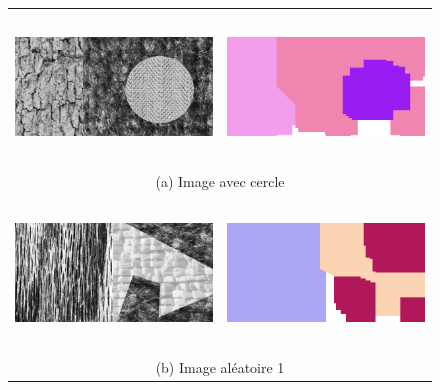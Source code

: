 \begin{figure}

\begin{tabular}{cccc}


\multicolumn{2}{c}{\includegraphics[width=8cm, height=4cm]{Figures/chap3/cercle1.png}}
&
\multicolumn{2}{c}{\includegraphics[width=8cm, height=4cm]{Figures/chap3/cercle1cc.png}}\\

\multicolumn{4}{c}{(a) Image avec cercle}\\


\multicolumn{2}{c}{\includegraphics[width=8cm, height=4cm]{Figures/chap3/randome1.png}}
&
\multicolumn{2}{c}{\includegraphics[width=8cm, height=4cm]{Figures/chap3/randome1cc.png}}\\

\multicolumn{4}{c}{(b) Image aléatoire 1}\\



\end{tabular}
\end{figure}
